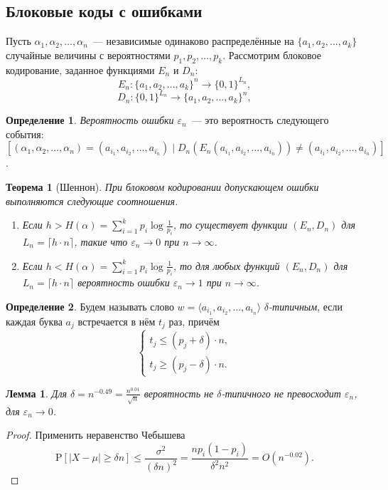 \documentclass[12pt]{article}
\newcommand{\seqn}[2]{{#1}_1,{#1}_2,\dotsc,{#1}_{#2}}
\newcommand{\seqin}[3]{{#1}_{{#2}_1},{#1}_{{#2}_2},\dotsc,{#1}_{{#2}_{#3}}}
\theoremstyle{definition}
\newtheorem{definition}{Определение}[section]
\theoremstyle{plain}
\newtheorem{theorem}{Теорема}[section]
\newtheorem{lemma}{Лемма}[section]
\theoremstyle{remark}
\begin{document}
\subsection{Блоковые коды с ошибками}
Пусть $\seqn{\alpha}{n}$~--- независимые одинаково распределённые на
$\{\seqn{a}{k}\}$ случайные величины с вероятностями $\seqn{p}{k}$.
Рассмотрим блоковое кодирование, заданное функциями $E_n$ и $D_n$:
\[
    E_n:\{\seqn{a}{k}\}^n \to \{0,1\}^{L_n},
\]
\[
    D_n:\{0,1\}^{L_n} \to \{\seqn{a}{k}\}^n ,
\]
\begin{definition}
    \emph{Вероятность ошибки $\varepsilon_n$}~--- это вероятность следующего
    события: $[(\seqn{\alpha}{n}) = (\seqin{a}{i}{n}) \mid
    D_n(E_n(\seqin{a}{i}{n}))\neq (\seqin{a}{i}{n})]$.
\end{definition}
\begin{theorem}[Шеннон]\label{thm:blockcoding}
    При блоковом кодировании допускающем ошибки выполняются следующие
    соотношения.
    \begin{enumerate}
        \item Если $h > H(\alpha) = \sum_{i=1}^{k} p_i\log\frac{1}{p_i}$, то
            существует функции $(E_n, D_n)$ для $L_n = \lceil h\cdot n \rceil$,
            такие что $\varepsilon_n\to0$ при $n\to\infty$.

        \item Если $h < H(\alpha) = \sum_{i=1}^{k} p_i\log\frac{1}{p_i}$, то
            для любых функций $(E_n, D_n)$ для $L_n = \lceil h\cdot n \rceil$
            вероятность ошибки $\varepsilon_n\to1$ при $n\to\infty$.
    \end{enumerate}
\end{theorem}
\begin{definition}
    Будем называть слово $w=\langle\seqin{a}{i}{n}\rangle$ \emph{$\delta$-типичным}, если
    каждая буква $a_j$ встречается в нём $t_j$ раз, причём
    \[
    \begin{cases}
        t_j\le (p_j + \delta)\cdot n,\\
        t_j\ge (p_j - \delta)\cdot n.
    \end{cases}
    \]
\end{definition}
\begin{lemma}\label{lm:typicalwordprob}
    Для $\delta = n^{-0.49} = \frac{n^{0.01}}{\sqrt n}$ вероятность не
    $\delta$-типичного не превосходит $\varepsilon_n$, для $\varepsilon_n\to 0$.
\end{lemma}
\begin{proof}
    Применить неравенство Чебышева
    \[
    \mathrm {P}[|X-\mu |\ge \delta n]\le \frac {\sigma^2}{(\delta n)^2} =
    \frac{np_i(1-p_i)}{\delta^2 n^2} = O(n^{-0.02}). 
    \]
\end{proof}
\end{document}
